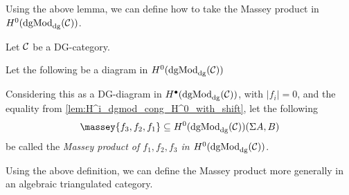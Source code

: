 Using the above lemma, we can define how to take the Massey product in \( H^0(\operatorname{dgMod}_{\operatorname{dg}}({\mathcal{C}})) \).

\begin{definition}
    \label{def:massey_product_H^0(dgMod_dg(C))}
    Let \( {\mathcal{C}} \) be a DG-category.
    
    Let the following be a diagram in \( H^0(\operatorname{dgMod}_{\operatorname{dg}}({\mathcal{C}})) \)
    \begin{center}
    \end{center}
    Considering this as a DG-diagram in \( H^{\bullet}(\operatorname{dgMod}_{\operatorname{dg}}({\mathcal{C}})) \), with \( |f_i| = 0 \), and the equality from \autoref{lem:H^i_dgmod_cong_H^0_with_shift}, let the following
    \[
        \massey{f_3, f_2, f_1} \subseteq H^0(\dgMod_{\dg}(\Cc))(\Sigma A, B)
    \]
    be called the \emph{Massey product of \( f_1, f_2, f_3 \) in \( H^0(\operatorname{dgMod}_{\operatorname{dg}}({\mathcal{C}})) \)}.
\end{definition}

Using the above definition, we can define the Massey product more generally in an algebraic triangulated category.

